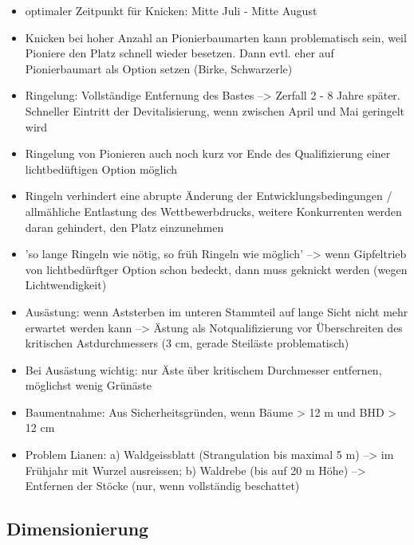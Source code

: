 \documentclass{article}
\begin{document}
\begin{itemize}
\begin{itemize}
     \item optimaler Zeitpunkt für Knicken: Mitte Juli - Mitte August
     
     \item Knicken bei hoher Anzahl an Pionierbaumarten kann problematisch sein, weil Pioniere den Platz schnell wieder besetzen. Dann evtl. eher auf Pionierbaumart als Option setzen (Birke, Schwarzerle)
     
     \item Ringelung: Vollständige Entfernung des Bastes --> Zerfall 2 - 8 Jahre später. Schneller Eintritt der Devitalisierung, wenn zwischen April und Mai geringelt wird
     
     \item Ringelung von Pionieren auch noch kurz vor Ende des Qualifizierung einer lichtbedüftigen Option möglich
     
     \item Ringeln verhindert eine abrupte Änderung der Entwicklungsbedingungen / allmähliche Entlastung des Wettbewerbdrucks, weitere Konkurrenten werden daran gehindert, den Platz einzunehmen
     
     \item 'so lange Ringeln wie nötig, so früh Ringeln wie möglich' --> wenn Gipfeltrieb von lichtbedürftger Option schon bedeckt, dann muss geknickt werden (wegen Lichtwendigkeit)
     
     \item Ausästung: wenn Aststerben im unteren Stammteil auf lange Sicht nicht mehr erwartet werden kann --> Ästung als Notqualifizierung vor Überschreiten des kritischen Astdurchmessers (3 cm, gerade Steiläste problematisch)
     
     \item Bei Ausästung wichtig: nur Äste über kritischem Durchmesser entfernen, möglichst wenig Grünäste
     
     \item Baumentnahme: Aus Sicherheitsgründen, wenn Bäume > 12 m und BHD > 12 cm
      
     \item Problem Lianen: a) Waldgeissblatt (Strangulation bis maximal 5 m) --> im Frühjahr mit Wurzel ausreissen; b) Waldrebe (bis auf 20 m Höhe) --> Entfernen der Stöcke (nur, wenn vollständig beschattet) 
     
     
  \end{itemize}

\newpage
\subsection{Dimensionierung}


\end{itemize}
\end{document}
